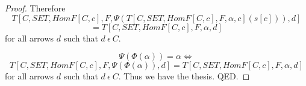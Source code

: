 \documentclass{article}
\newcommand{\inn}{~\epsilon~}
\newcommand{\innn}{~\epsilon~} %
\begin{document}
\begin{forthel}
\begin{proof}
		Therefore
		$$T[C,SET,HomF[C,c],F,\Psi(T[C,SET,HomF[C,c],F,\alpha,c](s[c])),d]$$
		$$=T[C,SET,HomF[C,c],F,\alpha,d]$$
		for all arrows $d$ such that $d\inn C$.

		
		$$\Psi(\Phi(\alpha)) = \alpha \iff $$
		$$T[C,SET,HomF[C,c],F,\Psi(\Phi(\alpha)),d] = T[C,SET,HomF[C,c],F,\alpha,d]$$
		for all arrows $d$ such that $d\inn C$. Thus we have the thesis.
		QED.

		

		\end{proof}


	\end{forthel}
	
\end{document}

